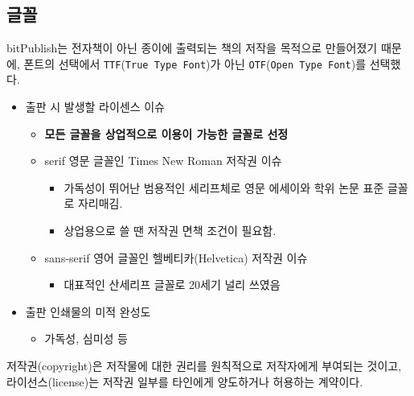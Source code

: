 \documentclass[
  letterpaper,
]{book}
\providecommand{\tightlist}{%
  \setlength{\itemsep}{0pt}\setlength{\parskip}{0pt}}\usepackage{longtable,booktabs,array}
\begin{document}
\hypertarget{uxae00uxaf34-1}{%
\subsection{글꼴}\label{uxae00uxaf34-1}}

bitPublish는 전자책이 아닌 종이에 출력되는 책의 저작을 목적으로
만들어졌기 때문에, 폰트의 선택에서
\texttt{TTF}(\texttt{True\ Type\ Font})가
아닌
\texttt{OTF}(\texttt{Open\ Type\ Font})를
선택했다.

\begin{tcolorbox}[enhanced jigsaw, opacityback=0, opacitybacktitle=0.6, colback=white, rightrule=.15mm, coltitle=black, colframe=quarto-callout-warning-color-frame, colbacktitle=quarto-callout-warning-color!10!white, bottomrule=.15mm, bottomtitle=1mm, breakable, title=\textcolor{quarto-callout-warning-color}{\faExclamationTriangle}\hspace{0.5em}{글꼴(폰트) 선정 기준}, titlerule=0mm, leftrule=.75mm, toptitle=1mm, left=2mm, arc=.35mm, toprule=.15mm]

\begin{itemize}
\tightlist
\item
  출판 시 발생할 라이센스 이슈

  \begin{itemize}
  \tightlist
  \item
    \textbf{모든 글꼴을 상업적으로 이용이 가능한 글꼴로 선정}
  \item
    serif\footnotemark{} 영문 글꼴인 Times New
    Roman 저작권 이슈

    \begin{itemize}
    \tightlist
    \item
      가독성이 뛰어난 범용적인 세리프체로 영문 에세이와 학위 논문 표준
      글꼴로 자리매김.
    \item
      상업용으로 쓸 땐 저작권 면책 조건이 필요함.
    \end{itemize}
  \item
    sans-serif\footnotemark{} 영어 글꼴인
    헬베티카(Helvetica) 저작권 이슈

    \begin{itemize}
    \tightlist
    \item
      대표적인 산세리프 글꼴로 20세기 널리 쓰였음\\
    \end{itemize}
  \end{itemize}
\item
  출판 인쇄물의 미적 완성도

  \begin{itemize}
  \tightlist
  \item
    가독성, 심미성 등
  \end{itemize}
\end{itemize}

저작권(copyright)은 저작물에 대한 권리를 원칙적으로 저작자에게 부여되는
것이고, 라이선스(license)는 저작권 일부를 타인에게 양도하거나 허용하는
계약이다.

\end{tcolorbox}
\end{document}
